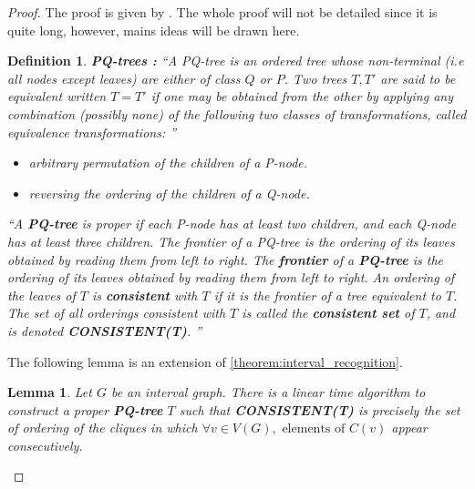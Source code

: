 \documentclass{article}
\newtheorem{definition}{Definition}[section]
\newtheorem{lemma}{Lemma}[section]
\begin{document}
\begin{proof}\label{proof:isomorphism}
    The proof is given by \cite{isomorphism}. The whole proof will not be detailed since it is quite long, however,
    mains ideas will be drawn here. \\

    \begin{definition}
        \textbf{PQ-trees : } 
        ``A PQ-tree is an ordered tree whose non-terminal 
        (\emph{i.e} all nodes except leaves) are either 
        of class $Q$ or $P$. Two trees $T,T'$ are said to be equivalent
        written $T=T'$ if one may be obtained from the other by applying
        any combination (possibly none) of the following two classes of
        transformations, called \emph{equivalence transformations}: '' \cite{isomorphism}

        \begin{itemize}
            \item arbitrary permutation of the children of a P-node.
            \item reversing the ordering of the children of a Q-node.
        \end{itemize}

        ``A \textbf{PQ-tree} is proper if each P-node has at least two children, and each Q-node has at
        least three children. The frontier of a PQ-tree is the ordering of its leaves obtained by reading them
        from left to right. The \textbf{frontier} of a \textbf{PQ-tree} is the ordering of its leaves obtained by reading them from left to right. 
        An ordering of the leaves of \( T \) is \textbf{consistent} with \( T \) if it is the frontier of a tree equivalent to $T$. 
        The set of all orderings consistent with \( T \) is called the \textbf{consistent set} of $T$, and is denoted \textbf{CONSISTENT(T)}.
        '' \cite{isomorphism}
    \end{definition}

    The following lemma is an extension of 
    \cref{theorem:interval_recognition}.\\

    \begin{lemma}\label{lemma:consistent}
        Let $G$ be an interval graph. There is a linear time 
        algorithm to construct a proper \textbf{PQ-tree} $T$ such that \textbf{CONSISTENT(T)} 
        is precisely the set of ordering of the cliques in which 
        $\forall v\in V(G), \text{ elements of } C(v)$ appear consecutively. 
    \end{lemma}


\end{proof}
\end{document}
